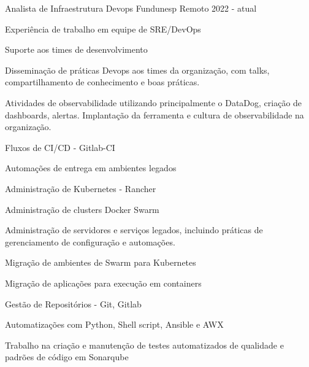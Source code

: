 

\begin{cventries}


\cventry
{Analista de Infraestrutura Devops} %
{Fundunesp} %
{Remoto} %
{2022 - atual} %
{
  \begin{cvitems} %
    \item {Experiência de trabalho em equipe de SRE/DevOps}
    \item {Suporte aos times de desenvolvimento}
    \item {Disseminação de práticas Devops aos times da organização, com talks, compartilhamento de conhecimento e boas práticas.}
    \item {Atividades de observabilidade utilizando principalmente o DataDog, criação de dashboards, alertas. Implantação da ferramenta e cultura de observabilidade na organização.}
    \item {Fluxos de CI/CD - Gitlab-CI}
    \item {Automações de entrega em ambientes legados}
    \item {Administração de Kubernetes - Rancher}
    \item {Administração de clusters Docker Swarm}
    \item {Administração de servidores e serviços legados, incluindo práticas de gerenciamento de configuração e automações.}
    \item {Migração de ambientes de Swarm para Kubernetes}
    \item {Migração de aplicações para execução em containers}
    \item {Gestão de Repositórios - Git, Gitlab}
    \item {Automatizações com Python, Shell script, Ansible e AWX}
    \item {Trabalho na criação e manutenção de testes automatizados de qualidade e padrões de código em Sonarqube}  
  \end{cvitems}
}


\end{cventries}

